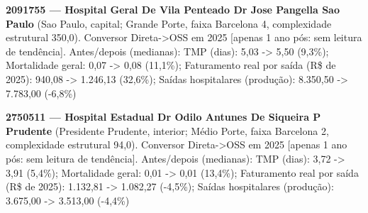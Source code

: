 \documentclass[12pt,a4paper]{article}
\begin{document}
\noindent\textbf{2091755 --- Hospital Geral De Vila Penteado Dr Jose Pangella Sao Paulo} (Sao Paulo, capital; Grande Porte, faixa Barcelona 4, complexidade estrutural 350,0). Conversor Direta->OSS em 2025 [apenas 1 ano pós: sem leitura de tendência]. Antes/depois (medianas): TMP (dias): 5,03 -> 5,50 (9,3\%); Mortalidade geral: 0,07 -> 0,08 (11,1\%); Faturamento real por saída (R\$ de 2025): 940,08 -> 1.246,13 (32,6\%); Saídas hospitalares (produção): 8.350,50 -> 7.783,00 (-6,8\%)\par\medskip
\noindent\textbf{2750511 --- Hospital Estadual Dr Odilo Antunes De Siqueira P Prudente} (Presidente Prudente, interior; Médio Porte, faixa Barcelona 2, complexidade estrutural 94,0). Conversor Direta->OSS em 2025 [apenas 1 ano pós: sem leitura de tendência]. Antes/depois (medianas): TMP (dias): 3,72 -> 3,91 (5,4\%); Mortalidade geral: 0,01 -> 0,01 (13,4\%); Faturamento real por saída (R\$ de 2025): 1.132,81 -> 1.082,27 (-4,5\%); Saídas hospitalares (produção): 3.675,00 -> 3.513,00 (-4,4\%)\par\medskip
\end{document}

